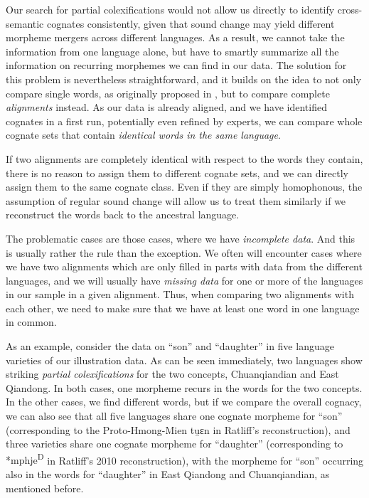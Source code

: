 \documentclass[xetex,svgnames]{scrartcl}
\begin{document}
Our search for partial colexifications would not allow us directly to identify cross-semantic
cognates consistently, given that sound change may yield different morpheme mergers across different
languages. As a result, we cannot take the information from one language alone, but have to smartly
summarize all the information on recurring morphemes we can find in our data. The solution for this
problem is nevertheless straightforward, and it builds on the idea to not only compare single words, as originally proposed in \citet{Hill2017a}, but to compare complete \emph{alignments} instead. As our data is already aligned, and we have identified
cognates in a first run, potentially even refined by experts, we can compare whole cognate sets that
contain \emph{identical words in the same language}. 

If two alignments are completely identical with respect to the words they contain, 
there is no reason
to assign them to different cognate sets, and we can directly assign them to the same cognate class.
Even if they are simply homophonous, the assumption of regular sound change will allow us to treat
them similarly if we reconstruct the words back to the ancestral language.

The problematic cases are those cases, where we have \emph{incomplete data}. And this is usually
rather the rule than the exception.  We often will encounter cases where we have two alignments
which are only filled in parts with data from the different languages, and we will usually have
\emph{missing data} for one or more of the languages in our sample in a given alignment. Thus, when
comparing two alignments with each other, we need to make sure that we have at least one word in one
language in common. 

As an example, consider the data on ``son'' and ``daughter'' in five language varieties of our
illustration data. As can be seen immediately, two languages show striking \emph{partial
colexifications} for the two concepts, Chuanqiandian and East Qiandong. In both cases, one morpheme
recurs in the words for the two concepts. In the other cases, we find different words, but if we
compare the overall cognacy, we can also see that all five languages share one cognate morpheme for
``son'' (corresponding to the Proto-Hmong-Mien {\sil *tu̯ɛn} in Ratliff's reconstruction), 
and three varieties share one cognate morpheme for ``daughter'' (corresponding to {\sil
*mphje\textsuperscript{D}} in Ratliff's 2010 reconstruction), with the morpheme for ``son''
occurring also in the words for ``daughter'' in East Qiandong and Chuanqiandian, as mentioned
before.\nocite{Ratliff2010}
\end{document}
